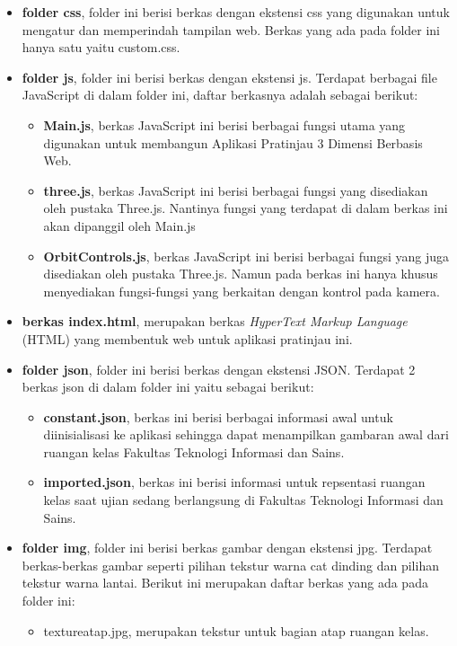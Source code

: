 \begin{itemize}
	\item {\bf folder css}, folder ini berisi berkas dengan ekstensi css yang digunakan untuk mengatur dan memperindah tampilan web. Berkas yang ada pada folder ini hanya satu yaitu custom.css.
	\item {\bf folder js}, folder ini berisi berkas dengan ekstensi js. Terdapat berbagai file JavaScript di dalam folder ini, daftar berkasnya adalah sebagai berikut:
		\begin{itemize}
			\item {\bf Main.js}, berkas JavaScript ini berisi berbagai fungsi utama yang digunakan untuk membangun Aplikasi Pratinjau 3 Dimensi Berbasis Web.
			\item {\bf three.js}, berkas JavaScript ini berisi berbagai fungsi yang disediakan oleh pustaka Three.js. Nantinya fungsi yang terdapat di dalam berkas ini akan dipanggil oleh Main.js
			\item {\bf OrbitControls.js}, berkas JavaScript ini berisi berbagai fungsi yang juga disediakan oleh pustaka Three.js. Namun pada berkas ini hanya khusus menyediakan fungsi-fungsi yang berkaitan dengan kontrol pada kamera.
		\end{itemize}
	\item {\bf berkas index.html}, merupakan berkas {\it HyperText Markup Language} (HTML) yang membentuk web untuk aplikasi pratinjau ini.
	\item {\bf folder json}, folder ini berisi berkas dengan ekstensi JSON. Terdapat 2 berkas json di dalam folder ini yaitu sebagai berikut:
		\begin{itemize}
			\item {\bf constant.json}, berkas ini berisi berbagai informasi awal untuk diinisialisasi ke aplikasi sehingga dapat menampilkan gambaran awal dari ruangan kelas Fakultas Teknologi Informasi dan Sains.
			\item {\bf imported.json}, berkas ini berisi informasi untuk repsentasi ruangan kelas saat ujian sedang berlangsung di Fakultas Teknologi Informasi dan Sains.
		\end{itemize}
	\item {\bf folder img}, folder ini berisi berkas gambar dengan ekstensi jpg. Terdapat berkas-berkas gambar seperti pilihan tekstur warna cat dinding dan pilihan tekstur warna lantai. Berikut ini merupakan daftar berkas yang ada pada folder ini:
	\begin{itemize}
		\item textureatap.jpg, merupakan tekstur untuk bagian atap ruangan kelas.

\end{itemize}
\end{itemize}
